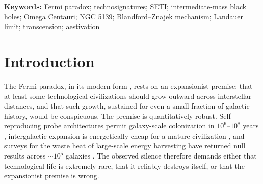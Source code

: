 \documentclass[11pt]{article}
\newcommand{\msun}{\ensuremath{M_\odot}}
\begin{document}
\begin{abstract}
We then identify Omega Centauri (NGC~5139), a $\sim 4\times10^{6}\,\msun$, $\sim$12-Gyr-old stripped dwarf-galaxy nucleus hosting the nearest strong candidate intermediate-mass black hole \citep{Haberle2024Nature}, as the most observationally accessible system satisfying the MTH selection criteria, and present a falsification framework built on six instrument-matched tests: accretion-luminosity limits (JWST, ATCA), mid-infrared waste-heat limits (JWST), a gravitational-wave signature inconsistent with a single point mass, an EMRI point-mass measurement, and an EMRI spin measurement (the latter three via LISA, contingent on a compact-object inspiral occurring in-band during the mission), plus neutrino burst searches (KM3NeT). Current data, including the unresolved tension between a $\geq 8{,}200\,\msun$ kinematic lower bound \citep{Haberle2024Nature} and a $\lesssim 6{,}000\,\msun$ pulsar-timing upper bound \citep{BanaresHernandez2025} and the complete electromagnetic silence of the central object \citep{Mahida2026,Chen2025JWST}, are consistent with both the MTH and the more parsimonious gas-starvation null hypothesis; we identify which forthcoming observations would discriminate between them, and which would falsify the MTH outright. The hypothesis is offered in the falsificationist tradition of \citet{Sandberg2016} and \citet{Dvali2023}: a speculative but physically grounded working model whose value lies in the concrete observational program it motivates.
\end{abstract}

\bigskip
\noindent\textbf{Keywords:} Fermi paradox; technosignatures; SETI; intermediate-mass black holes; Omega Centauri; NGC 5139; Blandford--Znajek mechanism; Landauer limit; transcension; aestivation

\newpage
\tableofcontents
\newpage

\section{Introduction}
\label{sec:intro}

The Fermi paradox, in its modern form \citep{Hart1975,Tipler1980,Webb2015,Cirkovic2018,Forgan2019}, rests on an expansionist premise: that at least some technological civilizations should grow outward across interstellar distances, and that such growth, sustained for even a small fraction of galactic history, would be conspicuous. The premise is quantitatively robust. Self-reproducing probe architectures permit galaxy-scale colonization in $10^{6}$--$10^{8}$ years \citep{Tipler1980,Freitas1982}, intergalactic expansion is energetically cheap for a mature civilization \citep{Armstrong2013}, and surveys for the waste heat of large-scale energy harvesting have returned null results across $\sim 10^{5}$ galaxies \citep{Wright2014,Griffith2015}. The observed silence therefore demands either that technological life is extremely rare, that it reliably destroys itself, or that the expansionist premise is wrong.
\end{document}
